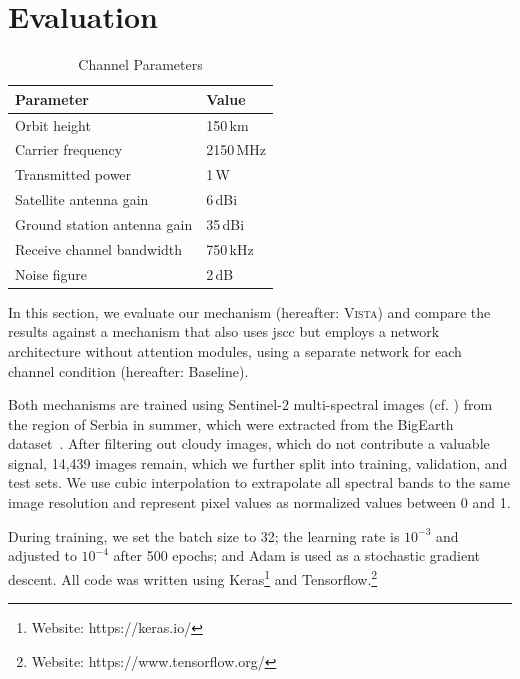 \documentclass[conference]{IEEEtran}
\newcommand\ours{\textsc{Vista}\xspace}
\newcommand\baseline{Baseline\xspace}
\newcommand\sentinelii{Sentinel-2\xspace}
\begin{document}

\section{Evaluation}
\label{sec:evaluation}

\begin{table}
  \caption{Channel Parameters}
  \label{tab:channel_parameters}

  \centering
	\begin{tabular}{ll}
		\toprule
    Parameter & Value \\
    \midrule
		Orbit height & 150\,km \\
		Carrier frequency & 2150\,MHz \\
    Transmitted power & 1\,W \\
    Satellite antenna gain & 6\,dBi \\
    Ground station antenna gain & 35\,dBi \\
		Receive channel bandwidth & 750\,kHz \\
		Noise figure & 2\,dB \\
		\bottomrule
	\end{tabular}
\end{table}

In this section, we evaluate our mechanism (hereafter: \ours) and compare the results against a mechanism that also uses \ac{jscc} but employs a network architecture without attention modules, using a separate network for each channel condition (hereafter: \baseline).

Both mechanisms are trained using \sentinelii multi-spectral images (cf. ) from the region of Serbia in summer, which were extracted from the BigEarth dataset~\cite{sumbul2019bigearthnet,Sumbul2021}.
After filtering out cloudy images, which do not contribute a valuable signal, 14,439 images remain, which we further split into training, validation, and test sets.
We use cubic interpolation to extrapolate all spectral bands to the same image resolution and represent pixel values as normalized values between 0 and 1.

During training, we set the batch size to 32; the learning rate is $10^{-3}$ and adjusted to $10^{-4}$ after 500 epochs; and Adam is used as a stochastic gradient descent.
All code was written using Keras\footnote{Website: https://keras.io/} and Tensorflow.\footnote{Website: https://www.tensorflow.org/}
\end{document}
